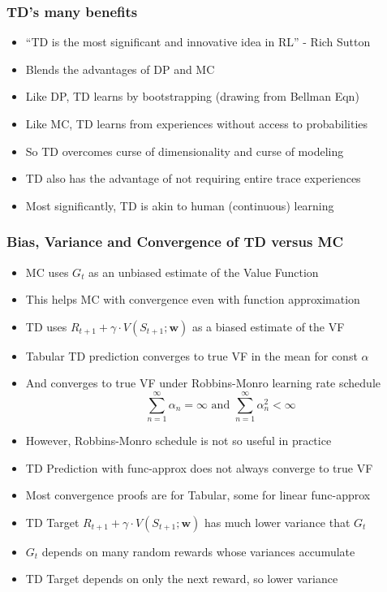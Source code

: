 \documentclass[handout]{beamer}
\begin{document}
\begin{frame}
\frametitle{TD's many benefits}
\pause
\begin{itemize}[<+->]
\item ``TD is the most significant and innovative idea in RL'' - Rich Sutton
\item Blends the advantages of DP and MC
\item Like DP, TD learns by bootstrapping (drawing from Bellman Eqn)
\item Like MC, TD learns from experiences without access to probabilities
\item So TD overcomes curse of dimensionality and curse of modeling
\item TD also has the advantage of not requiring entire trace experiences
\item Most significantly, TD is akin to human (continuous) learning
\end{itemize}
\end{frame}


\begin{frame}
\frametitle{Bias, Variance and Convergence of TD versus MC}
\pause
\begin{itemize}[<+->]
\item MC uses $G_t$ as an unbiased estimate of the Value Function
\item This helps MC with convergence even with function approximation
\item TD uses $R_{t+1} + \gamma \cdot V(S_{t+1};\bm{w})$ as a biased estimate of the VF
\item Tabular TD prediction converges to true VF in the mean for const $\alpha$
\item And converges to true VF under Robbins-Monro learning rate schedule
$$\sum_{n=1}^{\infty} \alpha_n = \infty \text{ and } \sum_{n=1}^{\infty} \alpha_n^2 < \infty$$
\item However, Robbins-Monro schedule is not so useful in practice
\item TD Prediction with func-approx does not always converge to true VF
\item Most convergence proofs are for Tabular, some for linear func-approx
\item TD Target $R_{t+1} + \gamma \cdot V(S_{t+1}; \bm{w})$ has much lower variance that $G_t$
\item $G_t$ depends on many random rewards whose variances accumulate
\item TD Target depends on only the next reward, so lower variance
\end{itemize}
\end{frame}
\end{document}
